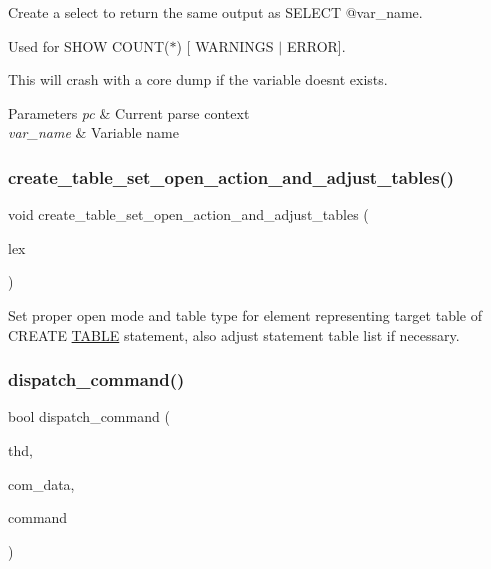 Create a select to return the same output as \textquotesingle{}S\+E\+L\+E\+CT @var\+\_\+name\textquotesingle{}.

Used for S\+H\+OW C\+O\+U\+N\+T($\ast$) \mbox{[} W\+A\+R\+N\+I\+N\+GS $\vert$ E\+R\+R\+OR\mbox{]}.

This will crash with a core dump if the variable doesn\textquotesingle{}t exists.


\begin{DoxyParams}{Parameters}
{\em pc} & Current parse context \\
\hline
{\em var\+\_\+name} & Variable name \\
\hline
\end{DoxyParams}
\mbox{\label{group__Runtime__Environment_ga95cca4e86f6c748bc34a5879ae0d36f4}} 
\subsubsection{\texorpdfstring{create\+\_\+table\+\_\+set\+\_\+open\+\_\+action\+\_\+and\+\_\+adjust\+\_\+tables()}{create\_table\_set\_open\_action\_and\_adjust\_tables()}}
{\footnotesize\ttfamily void create\+\_\+table\+\_\+set\+\_\+open\+\_\+action\+\_\+and\+\_\+adjust\+\_\+tables (\begin{DoxyParamCaption}\item[{L\+EX $\ast$}]{lex }\end{DoxyParamCaption})}

Set proper open mode and table type for element representing target table of C\+R\+E\+A\+TE \mbox{\hyperlink{structTABLE}{T\+A\+B\+LE}} statement, also adjust statement table list if necessary. \mbox{\label{group__Runtime__Environment_gabf07206792036bfb47e5bb8eb0f20bc4}} 
\subsubsection{\texorpdfstring{dispatch\+\_\+command()}{dispatch\_command()}}
{\footnotesize\ttfamily bool dispatch\+\_\+command (\begin{DoxyParamCaption}\item[{T\+HD $\ast$}]{thd,  }\item[{const C\+O\+M\+\_\+\+D\+A\+TA $\ast$}]{com\+\_\+data,  }\item[{enum enum\+\_\+server\+\_\+command}]{command }\end{DoxyParamCaption})}

